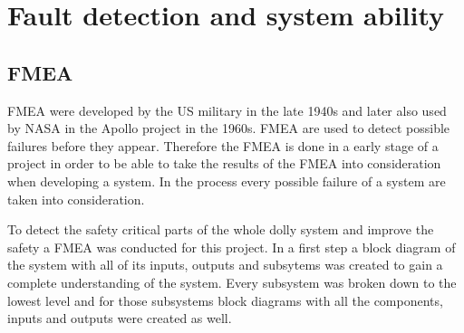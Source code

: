 \documentclass[ExampleMasters.tex]{subfiles}
\begin{document}
\clearpage
{\pagestyle{empty}\cleardoublepage}%

\chapter{Fault detection and system ability}
\label{chap:fault_detection}
\section{\acrfull{FMEA}}
\label{sec:FMEA}
\gls{FMEA} were developed by the US military in the late 1940s and later also used by NASA in the Apollo project in the 1960s.
\gls{FMEA} are used to detect possible failures before they appear. Therefore the \gls{FMEA} is done in a early stage of a project in order to be able to take the results of the \gls{FMEA} into consideration when developing a system. In the process every possible failure of a system are taken into consideration. 

To detect the safety critical parts of the whole dolly system and improve the safety a \gls{FMEA} was conducted for this project.
In a first step a block diagram of the system with all of its inputs, outputs and subsytems was created to gain a complete understanding of the system. Every subsystem was broken down to the lowest level and for those subsystems block diagrams with all the components, inputs and outputs were created as well.
\end{document}
